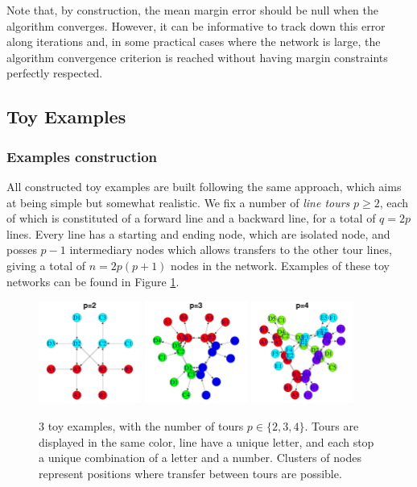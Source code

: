 \documentclass{bmcart}
\begin{document}
Note that, by construction, the mean margin error should be null when the algorithm converges. However, it can be informative to track down this error along iterations and, in some practical cases where the network is large, the algorithm convergence criterion is reached without having margin constraints perfectly respected.

\subsection{Toy Examples}
\label{toy_examples}

\subsubsection{Examples construction}
\label{example_construction}

All constructed toy examples are built following the same approach, which aims at being simple but somewhat realistic. We fix a number of \emph{line tours} $p \geq 2$, each of which is constituted of a forward line and a backward line, for a total of $q = 2p$ lines. Every line has a starting and ending node, which are isolated node, and posses $p-1$ intermediary nodes which allows transfers to the other tour lines, giving a total of $n = 2p(p + 1)$ nodes in the network. Examples of these toy networks can be found in Figure \ref{toy_example_plots}.

\begin{figure}[h]
	\includegraphics[width=0.3\textwidth]{fig/toy_2_display.pdf}
	\includegraphics[width=0.3\textwidth]{fig/toy_3_display.pdf}
	\includegraphics[width=0.3\textwidth]{fig/toy_4_display.pdf}
	\caption{3 toy examples, with the number of tours $p \in \{2,3,4\}$. Tours are displayed in the same color, line have a unique letter, and each stop a unique combination of a letter and a number. Clusters of nodes represent positions where transfer between tours are possible.}
	\label{toy_example_plots}
\end{figure}
\end{document}

